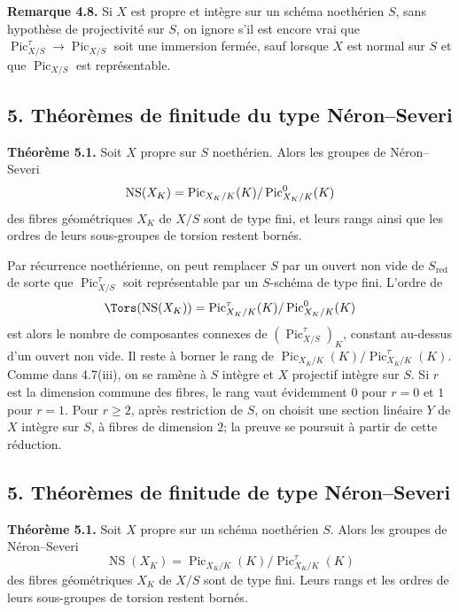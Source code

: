 \documentclass[11pt]{article}
\providecommand{\Pic}{\operatorname{Pic}}
\begin{document}
\textbf{Remarque 4.8.} Si $X$ est propre et int\`egre sur un sch\'ema noeth\'erien $S$, sans hypoth\`ese de projectivit\'e sur $S$, on ignore s'il est encore vrai que $\Pic^\tau_{X/S}\to\Pic_{X/S}$ soit une immersion ferm\'ee, sauf lorsque $X$ est normal sur $S$ et que $\Pic_{X/S}$ est repr\'esentable.

\subsection*{5. Th\'eor\`emes de finitude du type N\'eron--Severi}
\textbf{Th\'eor\`eme 5.1.} Soit $X$ propre sur $S$ noeth\'erien. Alors les groupes de N\'eron--Severi
\[
 \NS(X_K)=\Pic_{X_K/K}(K)/\Pic^0_{X_K/K}(K)
\]
des fibres g\'eom\'etriques $X_K$ de $X/S$ sont de type fini, et leurs rangs ainsi que les ordres de leurs sous-groupes de torsion restent born\'es.

Par r\'ecurrence noeth\'erienne, on peut remplacer $S$ par un ouvert non vide de $S_{\mathrm{red}}$ de sorte que $\Pic^\tau_{X/S}$ soit repr\'esentable par un $S$-sch\'ema de type fini. L'ordre de
\[
\Tors(\NS(X_K))=\Pic^\tau_{X_K/K}(K)/\Pic^0_{X_K/K}(K)
\]
est alors le nombre de composantes connexes de $(\Pic^\tau_{X/S})_K$, constant au-dessus d'un ouvert non vide. Il reste \`a borner le rang de $\Pic_{X_K/K}(K)/\Pic^\tau_{X_K/K}(K)$. Comme dans 4.7(iii), on se ram\`ene \`a $S$ int\`egre et $X$ projectif int\`egre sur $S$. Si $r$ est la dimension commune des fibres, le rang vaut \'evidemment $0$ pour $r=0$ et $1$ pour $r=1$. Pour $r\ge2$, apr\`es restriction de $S$, on choisit une section lin\'eaire $Y$ de $X$ int\`egre sur $S$, \`a fibres de dimension $2$; la preuve se poursuit \`a partir de cette r\'eduction.



\providecommand{\NS}{\operatorname{NS}}
\providecommand{\Picard}{\operatorname{Pic}}
\providecommand{\Et}{\mathrm{et}}
\providecommand{\rk}{\operatorname{rk}}
\providecommand{\im}{\operatorname{Im}}
\providecommand{\HH}{\mathrm H}


\subsection*{5. Th\'eor\`emes de finitude de type N\'eron--Severi}

\textbf{Th\'eor\`eme 5.1.} Soit $X$ propre sur un sch\'ema noeth\'erien $S$. Alors les groupes de N\'eron--Severi
\[
   \NS(X_K)=\Pic_{X_K/K}(K)/\Pic^\tau_{X_K/K}(K)
\]
des fibres g\'eom\'etriques $X_K$ de $X/S$ sont de type fini. Leurs rangs et les ordres de leurs sous-groupes de torsion restent born\'es.
\end{document}
